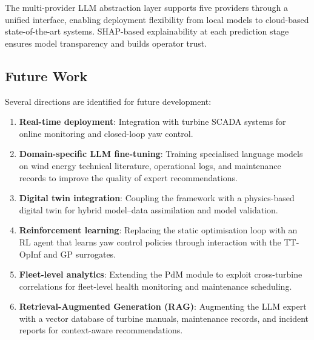 \documentclass[12pt]{article}
\begin{document}
The multi-provider LLM abstraction layer supports five providers through a unified interface, enabling deployment flexibility from local models to cloud-based state-of-the-art systems.
SHAP-based explainability at each prediction stage ensures model transparency and builds operator trust.

\subsection{Future Work}

Several directions are identified for future development:
\begin{enumerate}[leftmargin=*]
    \item \textbf{Real-time deployment}: Integration with turbine SCADA systems for online monitoring and closed-loop yaw control.
    \item \textbf{Domain-specific LLM fine-tuning}: Training specialised language models on wind energy technical literature, operational logs, and maintenance records to improve the quality of expert recommendations.
    \item \textbf{Digital twin integration}: Coupling the framework with a physics-based digital twin for hybrid model--data assimilation and model validation.
    \item \textbf{Reinforcement learning}: Replacing the static optimisation loop with an RL agent that learns yaw control policies through interaction with the TT-OpInf and GP surrogates.
    \item \textbf{Fleet-level analytics}: Extending the PdM module to exploit cross-turbine correlations for fleet-level health monitoring and maintenance scheduling.
    \item \textbf{Retrieval-Augmented Generation (RAG)}: Augmenting the LLM expert with a vector database of turbine manuals, maintenance records, and incident reports for context-aware recommendations.
\end{enumerate}




\end{document}
